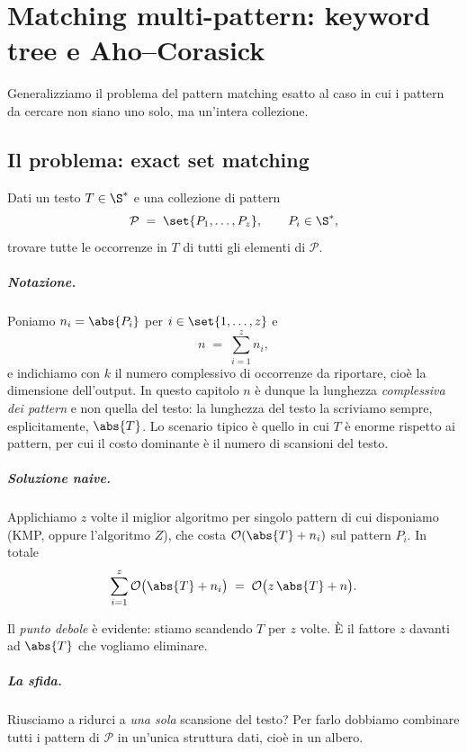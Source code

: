 \chapter{Matching multi-pattern: keyword tree e Aho--Corasick}
\label{cap:aho-corasick}

Generalizziamo il problema del pattern matching esatto al caso in cui i pattern da cercare
non siano uno solo, ma un'intera collezione.

\section{Il problema: exact set matching}
\label{sec:exact-set-matching}

\begin{definizione}\label{def:exact-set-matching}
Dati un testo $T \in \S^{*}$ e una collezione di pattern
\[
  \mathcal{P} \;=\; \set{P_1, \dots, P_z}, \qquad P_i \in \S^{*},
\]
trovare tutte le occorrenze in $T$ di tutti gli elementi di $\mathcal{P}$.
\end{definizione}

\paragraph{Notazione.}
Poniamo $n_i = \abs{P_i}$ per $i \in \set{1,\dots,z}$ e
\[
  n \;=\; \sum_{i=1}^{z} n_i ,
\]
e indichiamo con $k$ il numero complessivo di occorrenze da riportare, cioè la dimensione
dell'output. In questo capitolo $n$ è dunque la lunghezza \emph{complessiva dei pattern} e
non quella del testo: la lunghezza del testo la scriviamo sempre, esplicitamente,
$\abs{T}$. Lo scenario tipico è quello in cui $T$ è enorme rispetto ai pattern, per cui il
costo dominante è il numero di scansioni del testo.

\paragraph{Soluzione naive.}
Applichiamo $z$ volte il miglior algoritmo per singolo pattern di cui disponiamo (KMP,
oppure l'algoritmo $Z$), che costa $\Oh(\abs{T} + n_i)$ sul pattern $P_i$. In totale
\[
  \sum_{i=1}^{z} \Oh\bigl(\abs{T} + n_i\bigr)
  \;=\; \Oh\bigl(z\,\abs{T} + n\bigr).
\]

Il \emph{punto debole} è evidente: stiamo scandendo $T$ per $z$ volte. È il fattore $z$
davanti ad $\abs{T}$ che vogliamo eliminare.

\paragraph{La sfida.}
Riusciamo a ridurci a \emph{una sola} scansione del testo? Per farlo dobbiamo combinare
tutti i pattern di $\mathcal{P}$ in un'unica struttura dati, cioè in un albero.

